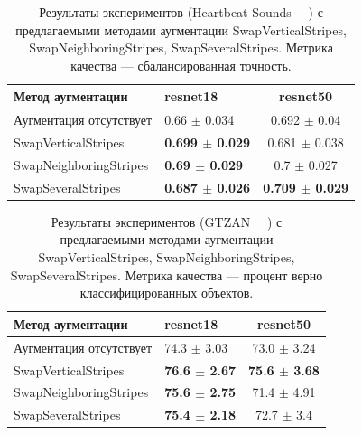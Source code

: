 \documentclass[12pt, fleqn]{article}
\begin{document}
\begin{table}[ht!]
    \centering
	\begin{tabular}{| l | l | c |}
    	\hline
	    Метод аугментации & resnet18 & resnet50 \\ \hline
	    Аугментация отсутствует  & 0.66 $\pm$ 0.034 & 0.692 $\pm$ 0.04 \\ \hline
	    SwapVerticalStripes & \textbf{0.699 $\pm$ 0.029} & 0.681 $\pm$ 0.038 \\ \hline
	    SwapNeighboringStripes & \textbf{0.69 $\pm$ 0.029} & 0.7 $\pm$ 0.027 \\ \hline
	    SwapSeveralStripes & \textbf{0.687 $\pm$ 0.026} & \textbf{0.709 $\pm$ 0.029} \\ \hline
	\end{tabular}
	\caption{Результаты экспериментов (Heartbeat Sounds ~\cite{HeartbeatSoundsArticle}~\cite{HeartbeatSoundsKaggle}) с предлагаемыми методами аугментации SwapVerticalStripes, SwapNeighboringStripes, SwapSeveralStripes. Метрика качества --- сбалансированная точность.}
	\label{table:lukianov_pavel_t1}
\end{table}

\begin{table}[ht!]
    \centering
	\begin{tabular}{| l | l | c |}
    	\hline
	    Метод аугментации & resnet18 & resnet50 \\ \hline
	    Аугментация отсутствует  & 74.3 $\pm$ 3.03 & 73.0 $\pm$ 3.24 \\ \hline
	    SwapVerticalStripes & \textbf{76.6 $\pm$ 2.67} & \textbf{75.6 $\pm$ 3.68} \\ \hline
	    SwapNeighboringStripes & \textbf{75.6 $\pm$ 2.75} & 71.4 $\pm$ 4.91 \\ \hline
	    SwapSeveralStripes & \textbf{75.4 $\pm$ 2.18} & 72.7 $\pm$ 3.4 \\ \hline
	\end{tabular}
	\caption{Результаты экспериментов (GTZAN ~\cite{GTZAN_Article}~\cite{GTZAN_kaggle}) с предлагаемыми методами аугментации SwapVerticalStripes, SwapNeighboringStripes, SwapSeveralStripes. Метрика качества --- процент верно классифицированных объектов.}
	\label{table:lukianov_pavel_t2}
\end{table}
\end{document}
